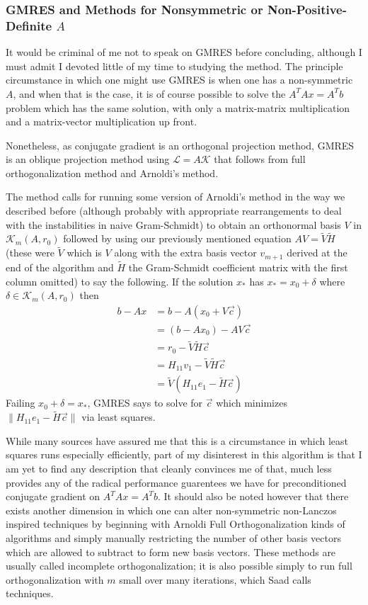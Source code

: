 \documentclass[11pt]{article}
\begin{document}
\subsubsection{GMRES and Methods for Nonsymmetric or Non-Positive-Definite $A$}

It would be criminal of me not to speak on GMRES before concluding, although I must admit I devoted little of my time to studying the method. The principle circumstance in which one might use GMRES is when one has a non-symmetric $A$, and when that is the case, it is of course possible to solve the $A^T A x = A^T b$ problem which has the same solution, with only a matrix-matrix multiplication and a matrix-vector multiplication up front.

Nonetheless, as conjugate gradient is an orthogonal projection method, GMRES is an oblique projection method using $\mathcal L = A \mathcal K$ that follows from full orthogonalization method and Arnoldi's method.

The method calls for running some version of Arnoldi's method in the way we described before (although probably with appropriate rearrangements to deal with the instabilities in naive Gram-Schmidt) to obtain an orthonormal basis $V$ in $\mathcal K_m(A,r_0)$ followed by using our previously mentioned equation $AV = \tilde V \tilde H$ (these were $\tilde V$ which is $V$ along with the extra basis vector $v_{m+1}$ derived at the end of the algorithm and $\tilde H$ the Gram-Schmidt coefficient matrix with the first column omitted) to say the following. If the solution $x_*$ has $x_* = x_0 + \delta$ where $\delta \in \mathcal K_m(A,r_0)$ then \begin{align*}
b - Ax &= b - A(x_0 + V \vec c)  \\
&= (b - Ax_0) - AV \vec c \\
&= r_0 - \tilde V \tilde H \vec c \\
&= H_{11} v_1 - \tilde V \tilde H \vec c \\
&= \tilde V (H_{11} e_1 - \tilde H \vec c)
\end{align*}
Failing $x_0 + \delta = x_*$, GMRES says to solve for $\vec c$ which minimizes $\lVert H_{11} e_1 - \tilde H \vec c \rVert $ via least squares.

While many sources have assured me that this is a circumstance in which least squares runs especially efficiently,  part of my disinterest in this algorithm is that I am yet to find any description that cleanly convinces me of that, much less provides any of the radical performance guarentees we have for preconditioned conjugate gradient on $A^T A x = A^T b$. It should also be noted however that there exists another dimension in which one can alter non-symmetric non-Lanczos inspired techniques by beginning with Arnoldi Full Orthogonalization kinds of algorithms and simply manually restricting the number of other basis vectors which are allowed to subtract to form new basis vectors. These methods are usually called incomplete orthogonalization; it is also possible simply to run full orthogonalization with $m$ small over many iterations, which Saad calls  techniques.
\end{document}
